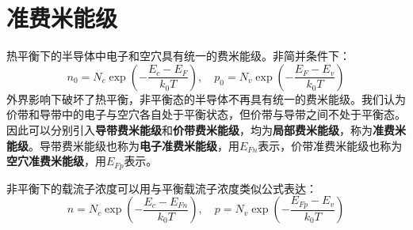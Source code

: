 \section{准费米能级}

热平衡下的半导体中电子和空穴具有统一的费米能级。非简并条件下：
\begin{equation}
    n_0=N_c\exp{\left(-\frac{E_c-E_F}{k_0T}\right)},\quad p_0=N_v\exp{\left(-\frac{E_F-E_v}{k_0T}\right)}
\end{equation}
外界影响下破坏了热平衡，非平衡态的半导体不再具有统一的费米能级。我们认为价带和导带中的电子与空穴各自处于平衡状态，但价带与导带之间不处于平衡态。因此可以分别引入\textbf{导带费米能级}和\textbf{价带费米能级}，均为\textbf{局部费米能级}，称为\textbf{准费米能级}。导带费米能级也称为\textbf{电子准费米能级}，用$E_{Fn}$表示，价带准费米能级也称为\textbf{空穴准费米能级}，用$E_{Fp}$表示。

非平衡下的载流子浓度可以用与平衡载流子浓度类似公式表达：
\begin{equation}
    n=N_c\exp{\left(-\frac{E_c-E_{Fn}}{k_0T}\right)},\quad p=N_v\exp{\left(-\frac{E_{Fp}-E_v}{k_0T}\right)}
\end{equation}





